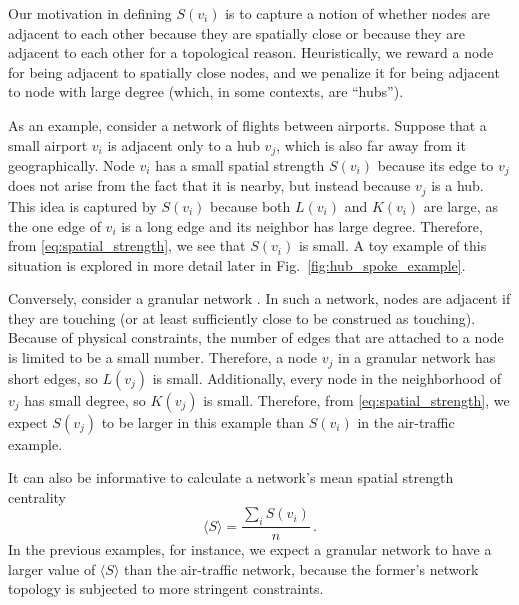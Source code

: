 \documentclass[%
 reprint,
 amsmath,amssymb,
 aps,
]{revtex4-1}
\begin{document}
Our motivation in defining $S(v_i)$ is to capture a notion of whether nodes are adjacent to each other because they are spatially close or because they are adjacent to each other for a topological reason. Heuristically, we reward a node for being adjacent to spatially close nodes, and we penalize it for being adjacent to node with large degree (which, in some contexts, are ``hubs'').

As an example, consider a network of flights between airports. Suppose that a small airport $v_i$ is adjacent only to a hub $v_j$, which is also far away from it geographically. Node $v_i$ has a small spatial strength $S(v_i)$ because its edge to $v_j$ does not arise from the fact that it is nearby, but instead because $v_j$ is a hub. This idea is captured by $S(v_i)$ because both $L(v_i)$ and $K(v_i)$ are large, as the one edge of $v_i$ is a long edge and its neighbor has large degree. Therefore, from \eqref{eq:spatial_strength}, we see that $S(v_i)$ is small. A toy example of this situation is explored in more detail later in Fig.~\ref{fig:hub_spoke_example}.

Conversely, consider a granular network \cite{papa2018}. In such a network, nodes are adjacent if they are touching (or at least sufficiently close to be construed as touching). Because of physical constraints, the number of edges that are attached to a node is limited to be a small number.
Therefore, a
node $v_j$ in a granular network has short edges, so $L(v_j)$ is small. Additionally, every node in the neighborhood of $v_j$ has small degree, so $K(v_j)$ is small. Therefore, from \eqref{eq:spatial_strength}, we expect $S(v_j)$ to be larger in this example than $S(v_i)$ in the air-traffic example. 

It can also be informative to calculate a network's mean spatial strength centrality
\begin{equation}
    \langle S \rangle = \frac{\sum_i S(v_i)}{n}\,.
\end{equation}
In the previous examples, for instance, we expect a granular network to have a larger value of $\langle S \rangle$ than the air-traffic network, because the former's network topology is subjected to more stringent constraints.
\end{document}
